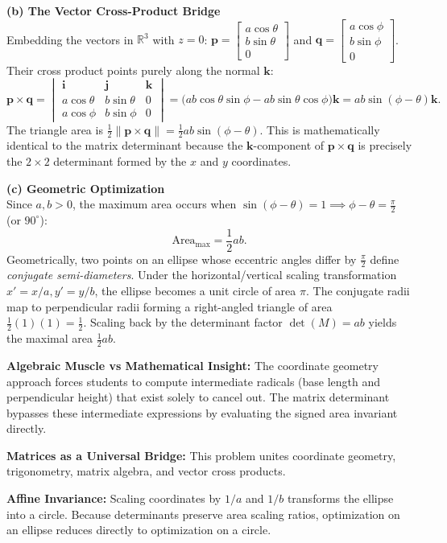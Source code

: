 \begin{solution}
\medskip
\textbf{(b) The Vector Cross-Product Bridge} \\
Embedding the vectors in $\mathbb{R}^3$ with $z=0$: $\mathbf{p} = \begin{bmatrix} a\cos\theta \\ b\sin\theta \\ 0 \end{bmatrix}$ and $\mathbf{q} = \begin{bmatrix} a\cos\phi \\ b\sin\phi \\ 0 \end{bmatrix}$. \\
Their cross product points purely along the normal $\mathbf{k}$:
\[
\mathbf{p} \times \mathbf{q} = \begin{vmatrix} \mathbf{i} & \mathbf{j} & \mathbf{k} \\ a\cos\theta & b\sin\theta & 0 \\ a\cos\phi & b\sin\phi & 0 \end{vmatrix} = \bigl( ab\cos\theta\sin\phi - ab\sin\theta\cos\phi \bigr) \mathbf{k} = ab\sin(\phi - \theta)\mathbf{k}.
\]
The triangle area is $\frac{1}{2}\|\mathbf{p} \times \mathbf{q}\| = \frac{1}{2}ab\sin(\phi - \theta)$. This is mathematically identical to the matrix determinant because the $\mathbf{k}$-component of $\mathbf{p} \times \mathbf{q}$ is precisely the $2 \times 2$ determinant formed by the $x$ and $y$ coordinates.

\medskip
\textbf{(c) Geometric Optimization} \\
Since $a, b > 0$, the maximum area occurs when $\sin(\phi - \theta) = 1 \implies \phi - \theta = \frac{\pi}{2}$ (or $90^\circ$):
\[
\text{Area}_{\max} = \frac{1}{2}ab.
\]
Geometrically, two points on an ellipse whose eccentric angles differ by $\frac{\pi}{2}$ define \emph{conjugate semi-diameters}. Under the horizontal/vertical scaling transformation $x' = x/a, y' = y/b$, the ellipse becomes a unit circle of area $\pi$. The conjugate radii map to perpendicular radii forming a right-angled triangle of area $\frac{1}{2}(1)(1) = \frac{1}{2}$. Scaling back by the determinant factor $\det(M) = ab$ yields the maximal area $\frac{1}{2}ab$.
\end{solution}

\begin{takeaways}
\item \textbf{Algebraic Muscle vs Mathematical Insight:} The coordinate geometry approach forces students to compute intermediate radicals (base length and perpendicular height) that exist solely to cancel out. The matrix determinant bypasses these intermediate expressions by evaluating the signed area invariant directly.
\item \textbf{Matrices as a Universal Bridge:} This problem unites coordinate geometry, trigonometry, matrix algebra, and vector cross products.
\item \textbf{Affine Invariance:} Scaling coordinates by $1/a$ and $1/b$ transforms the ellipse into a circle. Because determinants preserve area scaling ratios, optimization on an ellipse reduces directly to optimization on a circle.
\end{takeaways}

